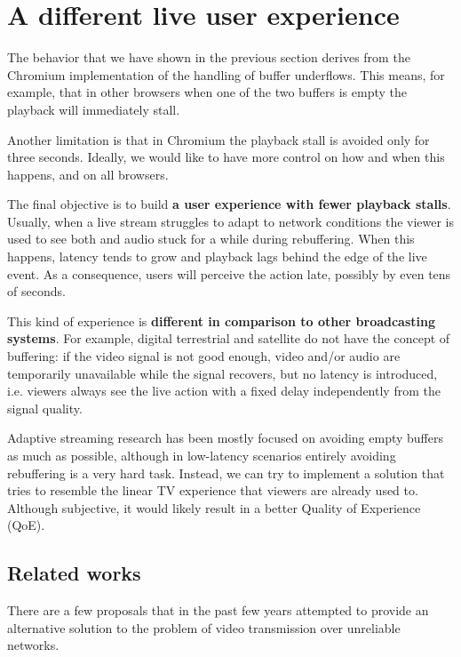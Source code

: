 \section{A different live user experience}
\label{sec:improvements/ux}

The behavior that we have shown in the previous section derives from the Chromium implementation of the handling of buffer underflows. This means, for example, that in other browsers when one of the two buffers is empty the playback will immediately stall.

Another limitation is that in Chromium the playback stall is avoided only for three seconds. Ideally, we would like to have more control on how and when this happens, and on all browsers.

The final objective is to build \textbf{a user experience with fewer playback stalls}. Usually, when a live stream struggles to adapt to network conditions the viewer is used to see both and audio stuck for a while during rebuffering. When this happens, latency tends to grow and playback lags behind the edge of the live event. As a consequence, users will perceive the action late, possibly by even tens of seconds.

This kind of experience is \textbf{different in comparison to other broadcasting systems}. For example, digital terrestrial and satellite do not have the concept of buffering: if the video signal is not good enough, video and/or audio are temporarily unavailable while the signal recovers, but no latency is introduced, i.e. viewers always see the live action with a fixed delay independently from the signal quality.

Adaptive streaming research has been mostly focused on avoiding empty buffers as much as possible, although in low-latency scenarios entirely avoiding rebuffering is a very hard task. Instead, we can try to implement a solution that tries to resemble the linear TV experience that viewers are already used to. Although subjective, it would likely result in a better Quality of Experience (QoE).

\subsection{Related works}
\label{sec:improvements/ux/related}

There are a few proposals that in the past few years attempted to provide an alternative solution to the problem of video transmission over unreliable networks.

